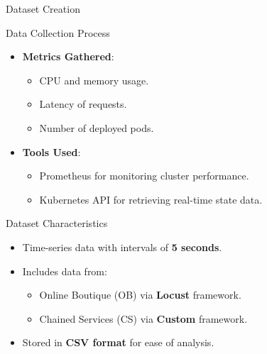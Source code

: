 \documentclass{beamer}
\begin{document}
\begin{frame}{Dataset Creation}
    \begin{block}{Data Collection Process}
        \begin{itemize}
            \item \textbf{Metrics Gathered}:
            \begin{itemize}
                \item CPU and memory usage.
                \item Latency of requests.
                \item Number of deployed pods.
            \end{itemize}
            \item \textbf{Tools Used}:
            \begin{itemize}
                \item Prometheus for monitoring cluster performance.
                \item Kubernetes API for retrieving real-time state data.
            \end{itemize}
        \end{itemize}
    \end{block}
    \begin{block}{Dataset Characteristics}
        \begin{itemize}
            \item Time-series data with intervals of \textbf{5 seconds}.
            \item Includes data from:
            \begin{itemize}
                \item Online Boutique (OB) via \textbf{Locust} framework.
                \item Chained Services (CS) via \textbf{Custom} framework.
            \end{itemize}
            \item Stored in \textbf{CSV format} for ease of analysis.
        \end{itemize}
    \end{block}
\end{frame}
\end{document}
